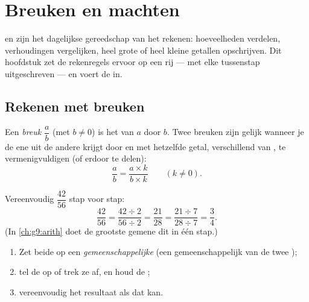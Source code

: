 \chapter{Breuken en machten}\label{ch:g9:fractions}

 en  zijn het dagelijkse gereedschap van het rekenen: hoeveelheden
verdelen, verhoudingen vergelijken, heel grote of heel kleine getallen opschrijven.
Dit hoofdstuk zet de rekenregels ervoor op een rij --- met elke tussenstap
uitgeschreven --- en voert de  in.

\section{Rekenen met breuken}

\begin{definition}[Breuk]\label{def:g9:fractions:fraction}
Een \emph{breuk} $\dfrac ab$ (met $b \neq 0$) is het  van
$a$ door $b$. Twee breuken zijn gelijk wanneer je de ene uit de andere krijgt door
 en  met hetzelfde getal, verschillend van , te vermenigvuldigen
(of erdoor te delen):
\[
\frac ab = \frac{a \times k}{b \times k} \qquad (k \neq 0).
\]
\end{definition}

\begin{example}\label{ex:g9:fractions:simplify}
Vereenvoudig $\dfrac{42}{56}$ stap voor stap:
\[
\frac{42}{56} = \frac{42 \div 2}{56 \div 2} = \frac{21}{28}
= \frac{21 \div 7}{28 \div 7} = \frac34 .
\]
(In \cref{ch:g9:arith} doet de grootste gemene  dit in één stap.)
\end{example}

\begin{method}\label{met:g9:fractions:add}
\begin{enumerate}
  \item Zet beide  op een \emph{gemeenschappelijke } (een
        gemeenschappelijk  van de twee );
  \item tel de  op of trek ze af, en houd de ;
  \item vereenvoudig het resultaat als dat kan.
\end{enumerate}
\end{method}

